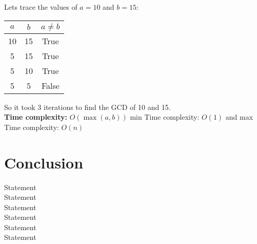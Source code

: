 \documentclass{article}
\begin{document}
Lets trace the values of $a = 10$ and $b = 15$:
\begin{table}[H]
    \centering
    \begin{tabular}{|c|c|c|}
        \hline
        $a$ & $b$ & $a \neq b$\\
        \hline
        10 & 15 & True\\
        5 & 15 & True\\
        5 & 10 & True\\
        5 & 5 & False\\
        \hline
    \end{tabular}
\end{table}
So it took 3 iterations to find the GCD of 10 and 15.\\
\textbf{Time complexity:} $O(\max(a,b))$
min Time complexity: $O(1)$ and max Time complexity: $O(n)$


\section{Conclusion}
\begin{algorithm}[H]
    \begin{algorithmic}
        \State Statement 
        \EndFor\\
        \State Statement 
        \EndFor\\
        \State Statement 
        \EndFor\\
        \State Statement 
        \EndFor\\
        \State Statement 
        \EndFor\\
        \State Statement 
        \EndFor\\
    \end{algorithmic}
\end{algorithm}
\end{document}
